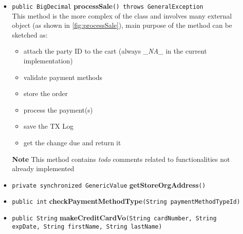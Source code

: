 \begin{itemize}
   \item \label{method:processSale} \texttt{public BigDecimal} \textbf{processSale}\texttt{() throws GeneralException}\\
   This method is the more complex of the class and involves many external object (as shown in \autoref{fig:processSale}), main purpose of the method can be sketched as:
   \begin{itemize}
   		\item attach the party ID to the cart (always \emph{\_NA\_} in the current implementation)
    	\item validate payment methods
    	\item store the order
    	\item process the payment(s)
   		\item save the TX Log
   		\item get the change due and return it
   \end{itemize}
   \textbf{Note} This method contains \emph{todo} comments related to functionalities not already implemented
   \item \texttt{private synchronized GenericValue} \textbf{getStoreOrgAddress}\texttt{()} \\
   \item \texttt{public int} \textbf{checkPaymentMethodType}\texttt{(String paymentMethodTypeId)} \\
   \item \texttt{public String} \textbf{makeCreditCardVo}\texttt{(String cardNumber, String expDate, String firstName, String lastName)} \\
\end{itemize}